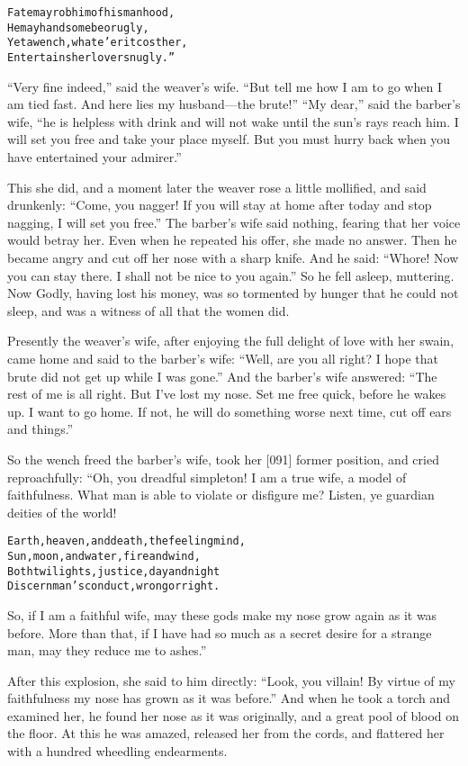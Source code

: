 \documentclass{article}
\renewenvironment{verbatim}{\begin{alltt}\normalfont\begin{centering}}{\end{centering}\end{alltt}}
\begin{document}
\begin{verbatim}
Fate may rob him of his manhood,
He may handsome be or ugly,
Yet a wench, whate'er it cost her,
Entertains her lover snugly.”
\end{verbatim}
``Very fine indeed,'' said the weaver's wife.
``But tell me how I am to go when I am tied fast. And here lies my husband---the brute!''
``My dear,'' said the barber's wife,
``he is helpless with drink and will not wake until the sun's rays reach him. I will set you free and take your place myself. But you must hurry back when you have entertained your admirer.''

This she did, and a moment later the weaver rose a little
mollified, and said drunkenly:
``Come, you nagger! If you will stay at home after today and stop nagging, I will set you free.''
The barber's wife said nothing, fearing that her voice would betray
her. Even when he repeated his offer, she made no answer. Then he
became angry and cut off her nose with a sharp knife. And he said:
``Whore! Now you can stay there. I shall not be nice to you again.''
So he fell asleep, muttering. Now Godly, having lost his money, was
so tormented by hunger that he could not sleep, and was a witness
of all that the women did.

Presently the weaver's wife, after enjoying the full delight of
love with her swain, came home and said to the barber's wife:
``Well, are you all right? I hope that brute did not get up while I was gone.''
And the barber's wife answered:
``The rest of me is all right. But I've lost my nose. Set me free quick, before he wakes up. I want to go home. If not, he will do something worse next time, cut off ears and things.''

So the wench freed the barber's wife, took her [091] former
position, and cried reproachfully: “Oh, you dreadful simpleton! I
am a true wife, a model of faithfulness. What man is able to
violate or disfigure me? Listen, ye guardian deities of the world!

\begin{verbatim}
Earth, heaven, and death, the feeling mind,
Sun, moon, and water, fire and wind,
Both twilights, justice, day and night
Discern man's conduct, wrong or right.
\end{verbatim}
So, if I am a faithful wife, may these gods make my nose grow again
as it was before. More than that, if I have had so much as a secret
desire for a strange man, may they reduce me to ashes.”

After this explosion, she said to him directly:
``Look, you villain! By virtue of my faithfulness my nose has grown as it was before.''
And when he took a torch and examined her, he found her nose as it
was originally, and a great pool of blood on the floor. At this he
was amazed, released her from the cords, and flattered her with a
hundred wheedling endearments.
\end{document}
